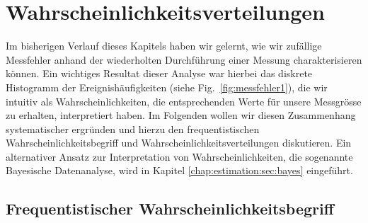 \section{Wahrscheinlichkeitsverteilungen}
\label{chap:fehler:sec:frequentistisch}

Im bisherigen Verlauf dieses Kapitels haben wir gelernt, wie wir zufällige Messfehler anhand der wiederholten Durchführung einer Messung charakterisieren können. Ein wichtiges Resultat dieser Analyse war hierbei das diskrete Histogramm der Ereignishäufigkeiten (siehe Fig.~\ref{fig:messfehler1}), die wir intuitiv als Wahrscheinlichkeiten, die entsprechenden Werte für unsere Messgrösse zu erhalten, interpretiert haben.  Im Folgenden wollen wir diesen Zusammenhang systematischer ergründen und hierzu den frequentistischen Wahrscheinlichkeitsbegriff und Wahrscheinlichkeitsverteilungen diskutieren.  Ein alternativer Ansatz zur Interpretation von Wahrscheinlichkeiten, die sogenannte Bayesische Datenanalyse, wird in Kapitel \ref{chap:estimation:sec:bayes} eingeführt. 


\subsection{Frequentistischer Wahrscheinlichkeitsbegriff}

